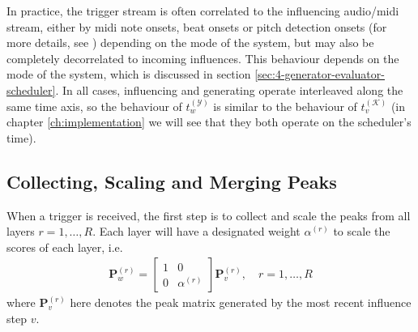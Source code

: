 In practice, the trigger stream is often correlated to the influencing audio/midi stream, either by midi note onsets, beat onsets or pitch detection onsets (for more details, see \cite{borg_2019}) depending on the mode of the system, but may also be completely decorrelated to incoming influences. This behaviour depends on the mode of the system, which is discussed in section \ref{sec:4-generator-evaluator-scheduler}. In all cases, influencing and generating operate interleaved along the same time axis, so the behaviour of $t^{(\mathcal Y)}_w$ is similar to the behaviour of $t^{(\mathcal K)}_v$ (in chapter \ref{ch:implementation} we will see that they both operate on the scheduler's time).


\subsection{Collecting, Scaling and Merging Peaks}\label{sec:3-generate-merge}
When a trigger is received, the first step is to collect and scale the peaks from all layers $r = 1, \dots, R$. Each layer will have a designated weight $\alpha^{(r)}$ to scale the scores of each layer, i.e.
\begin{align}
	\bm P^{(r)}_w = \begin{bmatrix} 1 & 0 \\ 0 & \alpha^{(r)} \end{bmatrix} \bm P^{(r)}_v,
	\quad r = 1, \dots, R
\end{align}
where $\bm P^{(r)}_v$ here denotes the peak matrix generated by the most recent influence step $v$.


